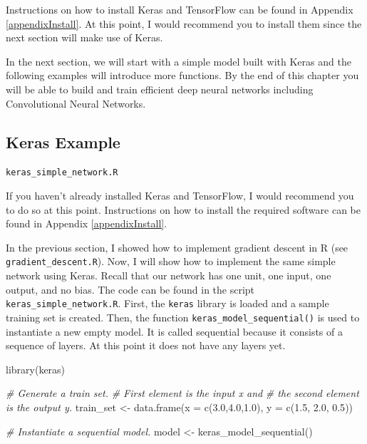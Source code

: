 \documentclass[
  11pt,
]{krantz}
\makeatletter
\newenvironment{Shaded}{\begin{snugshade}}{\end{snugshade}}
\newcommand{\AttributeTok}[1]{\textcolor[rgb]{0.61,0.61,0.61}{#1}}
\newcommand{\CommentTok}[1]{\textcolor[rgb]{0.37,0.37,0.37}{\textit{#1}}}
\newcommand{\FloatTok}[1]{\textcolor[rgb]{0.06,0.06,0.06}{#1}}
\newcommand{\FunctionTok}[1]{\textcolor[rgb]{0,0,0}{#1}}
\newcommand{\NormalTok}[1]{#1}
\newcommand{\OtherTok}[1]{\textcolor[rgb]{0.37,0.37,0.37}{#1}}
\newenvironment{kframe}{%
\medskip{}
\setlength{\fboxsep}{.8em}
 \def\at@end@of@kframe{}%
 \ifinner\ifhmode%
  \def\at@end@of@kframe{\end{minipage}}%
  \begin{minipage}{\columnwidth}%
 \fi\fi%
 \def\FrameCommand##1{\hskip\@totalleftmargin \hskip-\fboxsep
 \colorbox{shadecolor}{##1}\hskip-\fboxsep
     \hskip-\linewidth \hskip-\@totalleftmargin \hskip\columnwidth}%
 \MakeFramed {\advance\hsize-\width
   \@totalleftmargin\z@ \linewidth\hsize
   \@setminipage}}%
 {\par\unskip\endMakeFramed%
 \at@end@of@kframe}
\newenvironment{rmdblock}[1]
  {
  \begin{itemize}
  \renewcommand{\labelitemi}{
    \raisebox{-.7\height}[0pt][0pt]{
      {\setkeys{Gin}{width=3em,keepaspectratio}\texttt{[image: images/icons/\#1]}}
    }
  }
  \setlength{\fboxsep}{1em}
  \begin{kframe}
  \item
  }
  {
  \end{kframe}
  \end{itemize}
  }
\newenvironment{rmdinfo}
  {\begin{rmdblock}{info}}
  {\end{rmdblock}}
\newenvironment{rmdfolder}
  {\begin{rmdblock}{folder}}
  {\end{rmdblock}}
\makeatother
\begin{document}
\begin{rmdinfo}
Instructions on how to install Keras and TensorFlow can be found in Appendix \ref{appendixInstall}. At this point, I would recommend you to install them since the next section will make use of Keras.
\end{rmdinfo}

In the next section, we will start with a simple model built with Keras and the following examples will introduce more functions. By the end of this chapter you will be able to build and train efficient deep neural networks including Convolutional Neural Networks.

\hypertarget{keras-example}{%
\subsection{Keras Example}\label{keras-example}}

\begin{rmdfolder}
\texttt{keras\_simple\_network.R}
\end{rmdfolder}

If you haven't already installed Keras and TensorFlow, I would recommend you to do so at this point. Instructions on how to install the required software can be found in Appendix \ref{appendixInstall}.

In the previous section, I showed how to implement gradient descent in R (see \texttt{gradient\_descent.R}). Now, I will show how to implement the same simple network using Keras. Recall that our network has one unit, one input, one output, and no bias. The code can be found in the script \texttt{keras\_simple\_network.R}. First, the \texttt{keras} library is loaded and a sample training set is created. Then, the function \texttt{keras\_model\_sequential()} is used to instantiate a new empty model. It is called sequential because it consists of a sequence of layers. At this point it does not have any layers yet.

\begin{Shaded}
\begin{Highlighting}[]
\FunctionTok{library}\NormalTok{(keras)}

\CommentTok{\# Generate a train set.}
\CommentTok{\# First element is the input x and }
\CommentTok{\# the second element is the output y.}
\NormalTok{train\_set }\OtherTok{\textless{}{-}} \FunctionTok{data.frame}\NormalTok{(}\AttributeTok{x =} \FunctionTok{c}\NormalTok{(}\FloatTok{3.0}\NormalTok{,}\FloatTok{4.0}\NormalTok{,}\FloatTok{1.0}\NormalTok{),}
                        \AttributeTok{y =} \FunctionTok{c}\NormalTok{(}\FloatTok{1.5}\NormalTok{, }\FloatTok{2.0}\NormalTok{, }\FloatTok{0.5}\NormalTok{))}

\CommentTok{\# Instantiate a sequential model.}
\NormalTok{model }\OtherTok{\textless{}{-}} \FunctionTok{keras\_model\_sequential}\NormalTok{()}
\end{Highlighting}
\end{Shaded}
\end{document}
